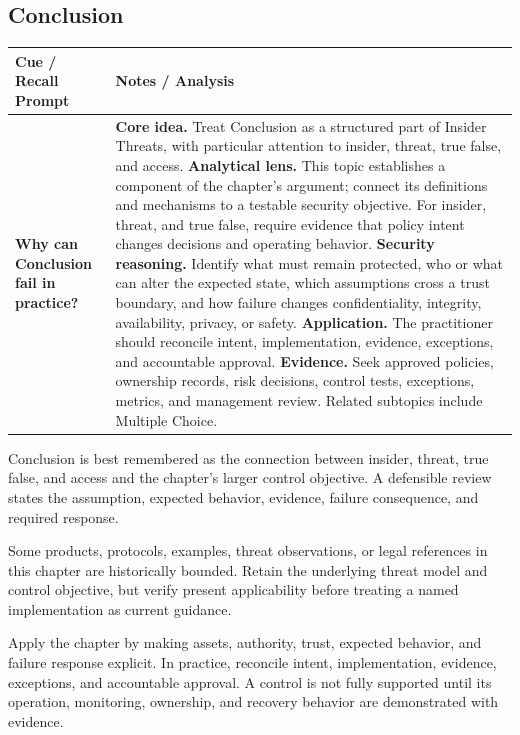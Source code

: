 \documentclass[11pt]{article}
\newcommand{\CornellHeader}{%
\rowcolor{Navy}\color{white}\bfseries Cue / Recall Prompt & \color{white}\bfseries Notes / Analysis\\\hline}
\newcommand{\CornellRow}[2]{%
\cellcolor{CueGray}\RaggedRight\textbf{#1} & \RaggedRight #2\\\hline}
\begin{document}
\subsection*{Conclusion}
\begin{longtable}{>{\RaggedRight\arraybackslash}p{}|>{\RaggedRight\arraybackslash}p{}}
\CornellHeader
\CornellRow{Why can Conclusion fail in practice?}{\textbf{Core idea.} Treat Conclusion as a structured part of Insider Threats, with particular attention to insider, threat, true false, and access. \textbf{Analytical lens.} This topic establishes a component of the chapter's argument; connect its definitions and mechanisms to a testable security objective. For insider, threat, and true false, require evidence that policy intent changes decisions and operating behavior. \textbf{Security reasoning.} Identify what must remain protected, who or what can alter the expected state, which assumptions cross a trust boundary, and how failure changes confidentiality, integrity, availability, privacy, or safety. \textbf{Application.} The practitioner should reconcile intent, implementation, evidence, exceptions, and accountable approval. \textbf{Evidence.} Seek approved policies, ownership records, risk decisions, control tests, exceptions, metrics, and management review. Related subtopics include Multiple Choice.}
\end{longtable}
\begin{topicsummary}
Conclusion is best remembered as the connection between insider, threat, true false, and access and the chapter's larger control objective. A defensible review states the assumption, expected behavior, evidence, failure consequence, and required response.
\end{topicsummary}
\begin{historybox}
Some products, protocols, examples, threat observations, or legal references in this chapter are historically bounded. Retain the underlying threat model and control objective, but verify present applicability before treating a named implementation as current guidance.
\end{historybox}
\begin{defensebox}
Apply the chapter by making assets, authority, trust, expected behavior, and failure response explicit. In practice, reconcile intent, implementation, evidence, exceptions, and accountable approval. A control is not fully supported until its operation, monitoring, ownership, and recovery behavior are demonstrated with evidence.
\end{defensebox}
\end{document}
